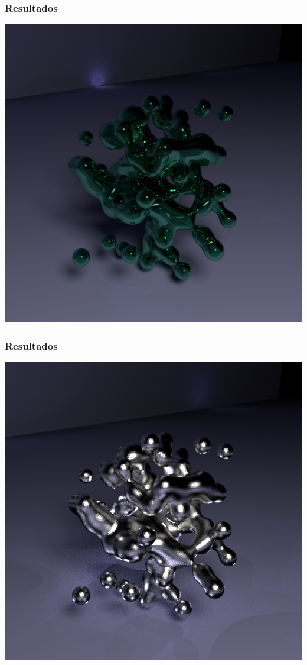 \documentclass[brazil]{beamer}
\begin{document}
      \begin{frame}
        \frametitle{Resultados}
        \begin{center}
          \includegraphics[width=.6\textwidth]{imgs/glass-blob-smooth.png}
        \end{center}
      \end{frame}

      \begin{frame}
        \frametitle{Resultados}
        \begin{center}
          \includegraphics[width=.6\textwidth]{imgs/metal-blob.png}
        \end{center}
      \end{frame}
\end{document}
